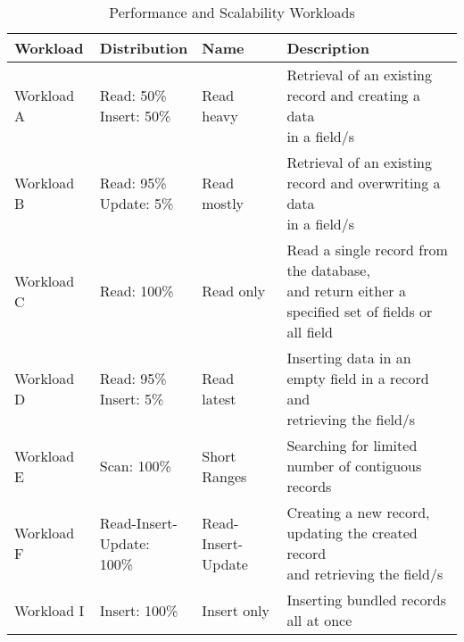 \begin{table*}[ht]
    \centering															
    \caption{Performance and Scalability Workloads}
     \label{table.workload.definition}
     \begin{tabular}{llll}
        \toprule
        Workload & Distribution & Name & Description\\
        \hline
        \rule{0pt}{20pt}Workload A &\makecell[l]{ Read: 50\%  \\ Insert: 50\%} & Read heavy        & \makecell[l]{Retrieval of an existing record and creating a data \\in a field/s} \\
        \rule{0pt}{20pt}Workload B &\makecell[l]{ Read: 95\%  \\ Update: 5\%}  & Read mostly       & \makecell[l]{Retrieval of an existing record and overwriting a data \\in a field/s} \\
        \rule{0pt}{20pt}Workload C &\makecell[l]{ Read: 100\% \\ }             & Read only         & \makecell[l]{Read a single record from the database, \\and return either a specified set of fields or all field} \\
        \rule{0pt}{20pt}Workload D &\makecell[l]{ Read: 95\%  \\ Insert: 5\%}  & Read latest       & \makecell[l]{Inserting data in an empty field in a record and \\retrieving the field/s} \\
        \rule{0pt}{20pt}Workload E & Scan: 100\%                               & Short Ranges      & Searching for limited number of contiguous records \\
        \rule{0pt}{20pt}Workload F &\makecell[l]{ Read-Insert-\\Update: 100\%} & Read-Insert-Update& \makecell[l]{Creating a new record, updating the created record \\and retrieving the field/s} \\
        \rule{0pt}{12pt}Workload I &\makecell[l]{ Insert: 100\%\\ }            & Insert only       & Inserting bundled records all at once \\
        \hline
    \end{tabular}															
\end{table*}															
